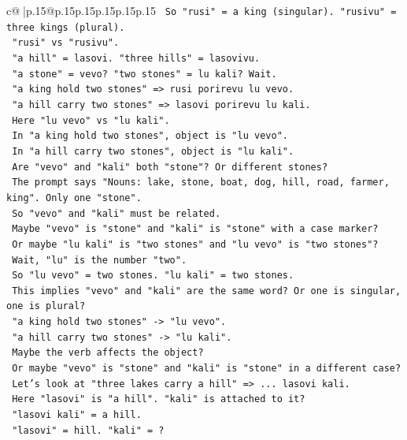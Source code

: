 \documentclass{article}
\begin{document}
{\begin{supertabular}{c@{$\;$}|p{.15\linewidth}@{}p{.15\linewidth}p{.15\linewidth}p{.15\linewidth}p{.15\linewidth}p{.15\linewidth}}
{{{\texttt{   So "rusi" = a king (singular). "rusivu" = three kings (plural).} \\
\texttt{   "rusi" vs "rusivu".} \\
\texttt{   "a hill" = lasovi. "three hills" = lasovivu.} \\
\texttt{   "a stone" = vevo? "two stones" = lu kali? Wait.} \\
\texttt{   "a king hold two stones" => rusi porirevu lu vevo.} \\
\texttt{   "a hill carry two stones" => lasovi porirevu lu kali.} \\
\texttt{   Here "lu vevo" vs "lu kali".} \\
\texttt{   In "a king hold two stones", object is "lu vevo".} \\
\texttt{   In "a hill carry two stones", object is "lu kali".} \\
\texttt{   Are "vevo" and "kali" both "stone"? Or different stones?} \\
\texttt{   The prompt says "Nouns: lake, stone, boat, dog, hill, road, farmer, king". Only one "stone".} \\
\texttt{   So "vevo" and "kali" must be related.} \\
\texttt{   Maybe "vevo" is "stone" and "kali" is "stone" with a case marker?} \\
\texttt{   Or maybe "lu kali" is "two stones" and "lu vevo" is "two stones"?} \\
\texttt{   Wait, "lu" is the number "two".} \\
\texttt{   So "lu vevo" = two stones. "lu kali" = two stones.} \\
\texttt{   This implies "vevo" and "kali" are the same word? Or one is singular, one is plural?} \\
\texttt{   "a king hold two stones" {-}> "lu vevo".} \\
\texttt{   "a hill carry two stones" {-}> "lu kali".} \\
\texttt{   Maybe the verb affects the object?} \\
\texttt{   Or maybe "vevo" is "stone" and "kali" is "stone" in a different case?} \\
\texttt{   Let's look at "three lakes carry a hill" => ... lasovi kali.} \\
\texttt{   Here "lasovi" is "a hill". "kali" is attached to it?} \\
\texttt{   "lasovi kali" = a hill.} \\
\texttt{   "lasovi" = hill. "kali" = ?} \\
}}}
\end{supertabular}}
\end{document}
